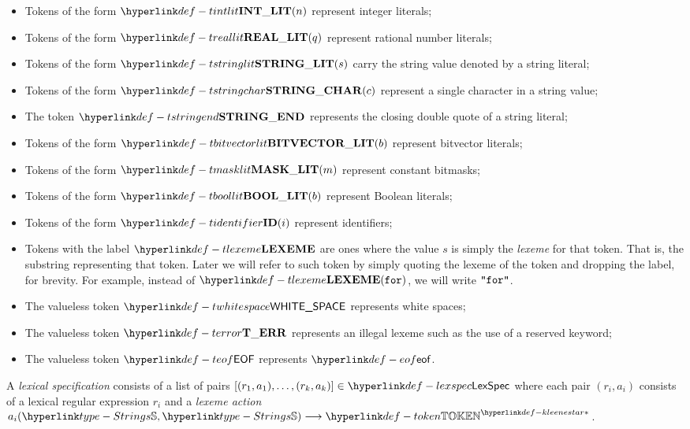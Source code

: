\hypertarget{def-tintlit}{}
\begin{itemize}
  \item Tokens of the form $\Tintlit(n)$ represent integer literals; \hypertarget{def-treallit}{}
  \item Tokens of the form $\Treallit(q)$ represent rational number literals; \hypertarget{def-tstringlit}{}
  \item Tokens of the form $\Tstringlit(s)$ carry the string value denoted by a string literal;
  \hypertarget{def-tstringchar}{}
  \item Tokens of the form $\Tstringchar(c)$ represent a single character in a string value;
  \hypertarget{def-tstringend}{}
  \item The token $\Tstringend$ represents the closing double quote of a string literal;
  \hypertarget{def-tbitvectorlit}{}
  \item Tokens of the form $\Tbitvectorlit(b)$ represent bitvector literals; \hypertarget{def-tmasklit}{}
  \item Tokens of the form $\Tmasklit(m)$ represent constant bitmasks; \hypertarget{def-tboollit}{}
  \item Tokens of the form $\Tboollit(b)$ represent Boolean literals; \hypertarget{def-tidentifier}{}
  \item Tokens of the form $\Tidentifier(i)$ represent identifiers; \hypertarget{def-tlexeme}{}
  \item Tokens with the label $\Tlexeme$ are ones where the value $s$ is simply the \emph{lexeme} for that token.
  That is, the substring representing that token. Later we will refer to such token by simply quoting
  the lexeme of the token and dropping the label, for brevity. For example, instead of $\Tlexeme(\texttt{for})$,
  we will write $\texttt{"}\texttt{for}\texttt{"}$. \hypertarget{def-twhitespace}{}
  \item The valueless token $\Twhitespace$ represents white spaces; \hypertarget{def-terror}{}
  \item The valueless token $\Terror$ represents an illegal lexeme such as the use of a reserved keyword;
  \hypertarget{def-teof}{}
  \item The valueless token $\Teof$ represents $\eof$.
\end{itemize}

\hypertarget{def-lexspec}{}
\begin{definition}
A \emph{lexical specification} consists of a list of pairs $[(r_1,a_1),\ldots,(r_k,a_k)] \in \LexSpec$
where each pair $(r_i,a_i)$ consists of a lexical regular expression $r_i$
and a \emph{lexeme action} $a_i(\Strings, \Strings) \aslto \KleeneStar{\Token}$.
\end{definition}

